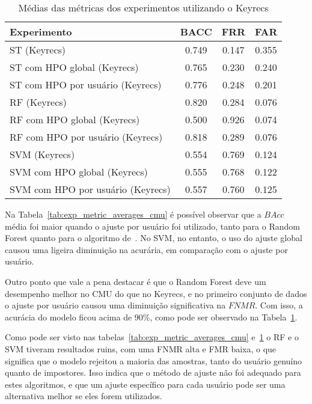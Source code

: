 \begin{table}[htbp]
\centering
\caption{Médias das métricas dos experimentos utilizando o Keyrecs}
\label{tab:exp_metric_averages_keyrecs}
\begin{tabular}{|l|c|c|c|}
\hline
\textbf{Experimento} & \textbf{BACC} & \textbf{FRR} & \textbf{FAR} \\
\hline
ST (Keyrecs) & 0.749 & 0.147 & 0.355 \\
\hline
ST com HPO global (Keyrecs) & 0.765 & 0.230 & 0.240 \\
\hline
ST com HPO por usuário (Keyrecs) & 0.776 & 0.248 & 0.201 \\
\hline
RF (Keyrecs) & 0.820 & 0.284 & 0.076 \\
\hline
RF com HPO global (Keyrecs) & 0.500 & 0.926 & 0.074 \\
\hline
RF com HPO por usuário (Keyrecs) & 0.818 & 0.289 & 0.076 \\
\hline
SVM (Keyrecs) & 0.554 & 0.769 & 0.124 \\
\hline
SVM com HPO global (Keyrecs) & 0.555 & 0.768 & 0.122 \\
\hline
SVM com HPO por usuário (Keyrecs) & 0.557 & 0.760 & 0.125 \\
\hline
\end{tabular}
\end{table}

Na Tabela~\ref{tab:exp_metric_averages_cmu} é possível observar que a $BAcc$ média foi maior quando o ajuste por usuário foi utilizado, tanto para o Random Forest quanto para o algoritmo de~. No SVM, no entanto, o uso do ajuste global causou uma ligeira diminuição na acurária, em comparação com o ajuste por usuário.

Outro ponto que vale a pena destacar é que o Random Forest deve um desempenho melhor no CMU do que no Keyrecs, e no primeiro conjunto de dados o ajuste por usuário causou uma diminuição significativa na $FNMR$. Com isso, a acurácia do modelo ficou acima de 90\%, como pode ser observado na Tabela~\ref{tab:exp_metric_averages_keyrecs}.

Como pode ser visto nas tabelas~\ref{tab:exp_metric_averages_cmu} e~\ref{tab:exp_metric_averages_keyrecs} o RF e o SVM tiveram resultados ruins, com uma FNMR alta e FMR baixa, o que significa que o modelo rejeitou a maioria das amostras, tanto do usuário genuíno quanto de impostores. Isso indica que o método de ajuste não foi adequado para estes algoritmos, e que um ajuste específico para cada usuário pode ser uma alternativa melhor se eles forem utilizados.


